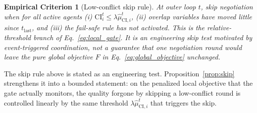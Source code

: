 \documentclass[conference]{IEEEtran}
\newtheorem{empiricalcriterion}{Empirical Criterion}
\begin{document}
\begin{empiricalcriterion}[Low-conflict skip rule]\label{crit:skip}
At outer loop $t$, skip negotiation when for all active agents (i) $\mathrm{CI}_i^t \le \lambda\hat{\mu}_{\mathrm{CI},i}^t$, (ii) overlap variables have moved little since $t_{\mathrm{last}}$, and (iii) the fail-safe rule has not activated. This is the relative-threshold branch of Eq.~\eqref{eq:local_gate}. It is an engineering skip test motivated by event-triggered coordination, not a guarantee that one negotiation round would leave the pure global objective $F$ in Eq.~\eqref{eq:global_objective} unchanged.
\end{empiricalcriterion}

The skip rule above is stated as an engineering test. Proposition~\ref{prop:skip} strengthens it into a bounded statement: on the penalized local objective that the gate actually monitors, the quality forgone by skipping a low-conflict round is controlled linearly by the same threshold $\lambda\hat{\mu}_{\mathrm{CI},i}^t$ that triggers the skip.
\end{document}
